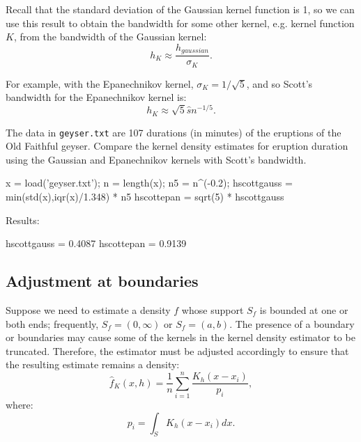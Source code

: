Recall that the standard deviation of the Gaussian kernel function is 1, so we can use this result to obtain the bandwidth for some other kernel, e.g. kernel function $K$, from the bandwidth of the Gaussian kernel:
\begin{equation}
h_K\approx \frac{h_{gaussian}}{\sigma_K}.
\end{equation}

For example, with the Epanechnikov kernel, $\sigma_K=1/\sqrt{5}$, and so Scott's bandwidth for the Epanechnikov kernel is:$$h_K\approx\sqrt{5}\hat{s}n^{-1/5}.$$

\begin{labwork}
The data in {\tt geyser.txt} are 107 durations (in minutes) of the eruptions of the Old Faithful geyser. Compare the kernel density estimates for eruption duration using the Gaussian and Epanechnikov kernels with Scott's bandwidth.

\begin{VrbM}
x = load('geyser.txt');
n = length(x);
n5 = n^(-0.2);
hscottgauss = min(std(x),iqr(x)/1.348) * n5 %
hscottepan = sqrt(5) * hscottgauss %
\end{VrbM}
Results:
\begin{VrbM}
hscottgauss = 0.4087
hscottepan = 0.9139
\end{VrbM}
\end{labwork}

\subsection{Adjustment at boundaries}
Suppose we need to estimate a density $f$ whose support $S_f$ is bounded at one or both ends; frequently, $S_f=(0,\infty)$ or $S_f=(a,b)$. The presence of a boundary or boundaries may cause some of the kernels in the kernel density estimator to be truncated. Therefore, the estimator must be adjusted accordingly to ensure that the resulting estimate remains a density:
\begin{equation}
\hat{f}_K(x,h)=\frac{1}{n}\sum^n_{i=1}\frac{K_h(x-x_i)}{p_i},
\end{equation}
where:
\begin{equation}
p_i=\int_SK_h(x-x_i)dx.
\end{equation}

